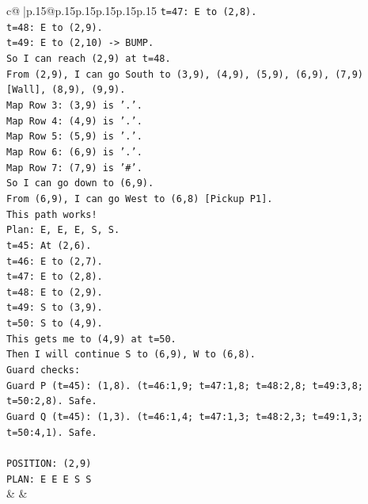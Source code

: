 \documentclass{article}
\begin{document}
{\begin{supertabular}{c@{$\;$}|p{.15\linewidth}@{}p{.15\linewidth}p{.15\linewidth}p{.15\linewidth}p{.15\linewidth}p{.15\linewidth}}
{{{\texttt{t=47: E to (2,8).} \\
\texttt{t=48: E to (2,9).} \\
\texttt{t=49: E to (2,10) {-}> BUMP.} \\
\texttt{So I can reach (2,9) at t=48.} \\
\texttt{From (2,9), I can go South to (3,9), (4,9), (5,9), (6,9), (7,9) {[}Wall{]}, (8,9), (9,9).} \\
\texttt{Map Row 3: (3,9) is '.'.} \\
\texttt{Map Row 4: (4,9) is '.'.} \\
\texttt{Map Row 5: (5,9) is '.'.} \\
\texttt{Map Row 6: (6,9) is '.'.} \\
\texttt{Map Row 7: (7,9) is '\#'.} \\
\texttt{So I can go down to (6,9).} \\
\texttt{From (6,9), I can go West to (6,8) {[}Pickup P1{]}.} \\
\texttt{This path works!} \\
\texttt{Plan: E, E, E, S, S.} \\
\texttt{t=45: At (2,6).} \\
\texttt{t=46: E to (2,7).} \\
\texttt{t=47: E to (2,8).} \\
\texttt{t=48: E to (2,9).} \\
\texttt{t=49: S to (3,9).} \\
\texttt{t=50: S to (4,9).} \\
\texttt{This gets me to (4,9) at t=50.} \\
\texttt{Then I will continue S to (6,9), W to (6,8).} \\
\texttt{Guard checks:} \\
\texttt{Guard P (t=45): (1,8). (t=46:1,9; t=47:1,8; t=48:2,8; t=49:3,8; t=50:2,8). Safe.} \\
\texttt{Guard Q (t=45): (1,3). (t=46:1,4; t=47:1,3; t=48:2,3; t=49:1,3; t=50:4,1). Safe.} \\
\\ 
\texttt{POSITION: (2,9)} \\
\texttt{PLAN: E E E S S} \\
            }
        }
    }
    & & \\ \\


\end{supertabular}}
\end{document}
